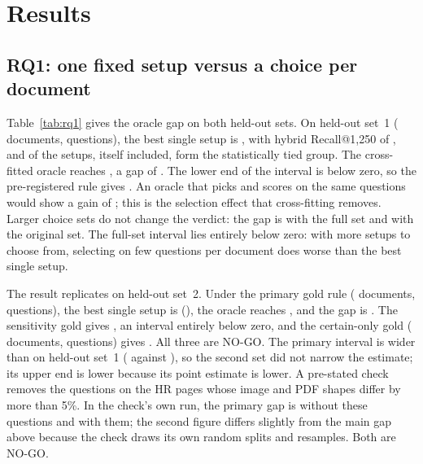 \section{Results}\label{sec:results}

\subsection{RQ1: one fixed setup versus a choice per document}\label{sec:rq1}



Table~\ref{tab:rq1} gives the oracle gap on both held-out sets. On held-out
set~1 (\RQoneDocuments{} documents, \RQoneQuestions{} questions), the best
single setup is \RQoneBest{}, with hybrid Recall@1,250 of \RQoneBestRecall{},
and \RQoneTied{} of the \RQoneSetups{} setups, itself included, form the
statistically tied group.
The cross-fitted oracle reaches \RQoneOracle{}, a gap of \RQonePrimaryGap{}
\RQonePrimaryGapCI{}. The lower end of the interval is below zero, so the
pre-registered rule gives \RQoneDecision{}. An oracle that picks and scores on
the same questions would show a gain of \RQoneRawGap{}; this is the selection
effect that cross-fitting removes. Larger choice sets do not change the
verdict: the gap is \RQoneFullGap{} \RQoneFullGapCI{} with the full set and
\RQoneOriginalGap{} \RQoneOriginalGapCI{} with the original set. The full-set
interval lies entirely below zero: with more setups to choose from, selecting on
few questions per document does worse than the best single setup.

The result replicates on held-out set~2. Under the primary gold rule
(\RQoneHTwoDropRuleDocuments{} documents, \RQoneHTwoDropRuleQuestions{}
questions), the best single setup is \RQoneHTwoDropRuleBest{}
(\RQoneHTwoDropRuleBestRecall{}), the oracle reaches
\RQoneHTwoDropRuleOracle{}, and the gap is \RQoneHTwoDropRuleGap{}
\RQoneHTwoDropRuleGapCI{}. The sensitivity gold gives
\RQoneHTwoSensitivityGap{} \RQoneHTwoSensitivityGapCI{}, an interval entirely
below zero, and the certain-only gold (\RQoneHTwoCertainOnlyDocuments{}
documents, \RQoneHTwoCertainOnlyQuestions{} questions) gives
\RQoneHTwoCertainOnlyGap{} \RQoneHTwoCertainOnlyGapCI{}. All three are
NO-GO. The primary interval is wider than on held-out set~1
(\RQoneHTwoDropRuleGapWidth{} against \RQonePrimaryGapWidth{}), so the second set
did not narrow the estimate; its upper end is lower because its point estimate
is lower.
A pre-stated check removes the \RQoneHRCheckExcludedQuestions{} questions on
the \RQoneHRCheckPages{} HR pages whose image and PDF shapes differ by more
than 5\%. In the check's own run, the primary gap is
\RQoneHRCheckWithoutGap{} \RQoneHRCheckWithoutGapCI{} without these questions
and \RQoneHRCheckWithGap{} \RQoneHRCheckWithGapCI{} with them; the second
figure differs slightly from the main gap above because the check draws its own
random splits and resamples. Both are NO-GO.

